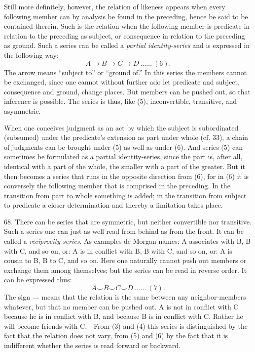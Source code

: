\documentclass[12pt,a4paper]{book}
\newcommand{\opage}[1]{\marginnote{\footnotesize\textit{[#1]}}}
\begin{document}
Still more definitely, however, the relation of likeness appears when every
following member can by analysis be found in the preceding, hence be said to
be contained therein. Such is the relation when the following member is
predicate in relation to the preceding as subject, or consequence in
relation to the preceding as ground. Such a series can be called a
\emph{partial identity-series} and is expressed in the following way:
\[ A \to B \to C \to D \ \ldots\ldots\ (6). \]
The arrow means ``subject to'' or ``ground of.'' In this series the members
cannot be exchanged, since one cannot without further ado let predicate and
subject, consequence and ground, change places. But members can be pushed
out, so that inference is possible. The series is thus, like (5),
inconvertible, transitive, and asymmetric.

When one conceives judgment as an act by which the subject is subordinated
(subsumed) under the predicate's extension as part under whole (cf. 33), a
chain of judgments can be brought under (5) as well as under (6). And series
(5) can sometimes be formulated as a partial identity-series, since the \opage{169}part
is, after all, identical with a part of the whole, the smaller with a part
of the greater. But it then becomes a series that runs in the opposite
direction from (6), for in (6) it is conversely the following member that is
comprised in the preceding. In the transition from part to whole something
is added; in the transition from subject to predicate a closer determination
and thereby a limitation takes place.

68. There can be series that are symmetric, but neither convertible nor
transitive. Such a series one can just as well read from behind as from the
front. It can be called a \emph{reciprocity-series}. As examples de Morgan
names: A associates with B, B with C, and so on, or: A is in conflict with B,
B with C, and so on, or: A is cousin to B, B to C, and so on. Here one
naturally cannot push out members or exchange them among themselves; but the
series can be read in reverse order. It can be expressed thus:
\[ A \smile B \smile C \smile D \ \ldots\ldots\ (7). \]
The sign $\smile$ means that the relation is the same between any
neighbor-members whatever, but that no member can be pushed out. A is not in
conflict with C because he is in conflict with B, and because B is in
conflict with C. Rather he will become friends with C.---From (3) and (4)
this series is distinguished by the fact that the relation does not vary,
from (5) and (6) by the fact that it is indifferent whether the series is
read forward or backward.
\end{document}
